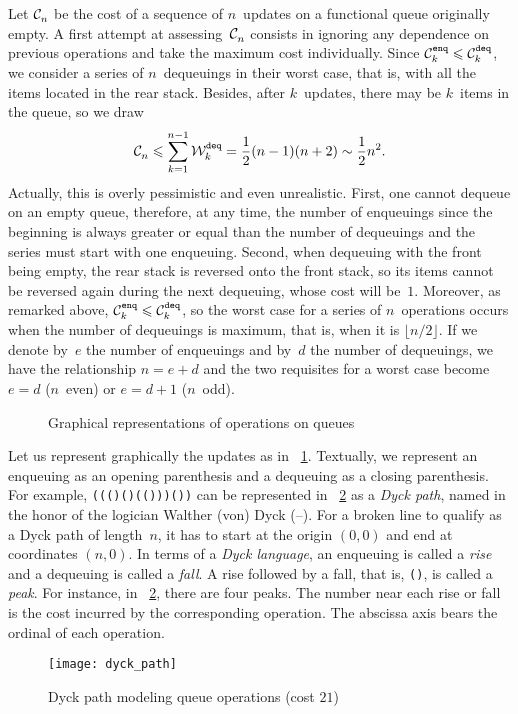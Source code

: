 Let \(\C{}{n}\) be the cost of a sequence of \(n\)~updates on a
functional queue originally empty. A first attempt at
assessing~\(\C{}{n}\) consists in ignoring any dependence on previous
operations and take the maximum cost individually. Since
\(\C{\texttt{enq}}{k} \leqslant \C{\texttt{deq}}{k}\), we consider a
series of \(n\)~dequeuings in their worst case, that is, with all the
items located in the rear stack. Besides, after \(k\)~updates, there
may be \(k\)~items in the queue, so we draw
\[
\C{}{n} \leqslant \sum_{k=1}^{n-1}{\W{\texttt{deq}}{k}} =
\frac{1}{2}{(n-1)(n+2)} \mathrel{\sim} \frac{1}{2}{n^2}.
\]
Actually, this is overly pessimistic and even unrealistic. First, one
cannot dequeue on an empty queue, therefore, at any time, the number
of enqueuings since the beginning is always greater or equal than the
number of dequeuings and the series must start with one
enqueuing. Second, when dequeuing with the front being empty, the rear
stack is reversed onto the front stack, so its items cannot be
reversed again during the next dequeuing, whose cost will
be~\(1\). Moreover, as remarked above, \(\C{\texttt{enq}}{k} \leqslant
\C{\texttt{deq}}{k}\), so the worst case for a series of
\(n\)~operations occurs when the number of dequeuings is maximum, that
is, when it is \(\lfloor{n/2}\rfloor\). If we denote by~\(e\) the
number of enqueuings and by~\(d\) the number of dequeuings, we have
the relationship \(n = e + d\) and the two requisites for a worst case
become \(e=d\) (\(n\)~even) or \(e=d+1\) (\(n\)~odd).
\begin{figure}
\centering
{}
\qquad
{}
\caption{Graphical representations of operations on queues\label{fig:enq_deq}}
\end{figure}

\medskip

 Let us represent graphically
the updates as in \fig~\ref{fig:enq_deq}.  Textually, we represent an
enqueuing as an opening parenthesis and a dequeuing as a closing
parenthesis. For example, \texttt{((()()(()))())} can be represented
in \fig~\ref{fig:dyck_path} as a \emph{Dyck path}, named in the honor
of the logician Walther (von) Dyck
(--).
For a broken line to qualify as a Dyck path of length~\(n\), it has to
start at the origin \((0,0)\) and end at coordinates \((n,0)\).  In
terms of a \emph{Dyck language}, an enqueuing is called a \emph{rise}
and a dequeuing is called a \emph{fall}. A rise followed by a fall,
that is, \texttt{()}, is called a \emph{peak}. For instance, in
\fig~\ref{fig:dyck_path}, there are four peaks. The number near each
rise or fall is the cost incurred by the corresponding operation. The
abscissa axis bears the ordinal of each operation.
\begin{figure}[h]
\centering
\texttt{[image: dyck\_path]}
\caption{Dyck path modeling queue operations (cost \(21\))
\label{fig:dyck_path}}
\end{figure}

